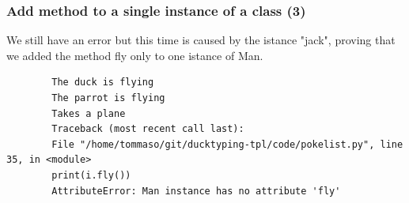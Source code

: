 \documentclass[xcolor ={table,usenames,dvipsnames}]{beamer}
\theoremstyle{definition}
\begin{document}
	\begin{frame}[fragile]
		\frametitle{Add method to a single instance of a class (3)}
			We still have an error but this time is caused by the istance "jack", proving that we added the method fly only to one istance of Man. 
		
		\begin{lstlisting}
		The duck is flying
		The parrot is flying
		Takes a plane
		Traceback (most recent call last):
		File "/home/tommaso/git/ducktyping-tpl/code/pokelist.py", line 35, in <module>
		print(i.fly())
		AttributeError: Man instance has no attribute 'fly'
		\end{lstlisting}
	\end{frame}

	

		
	
	

	
	
	
	
	
	
	
	
	
	
	
\end{document}

